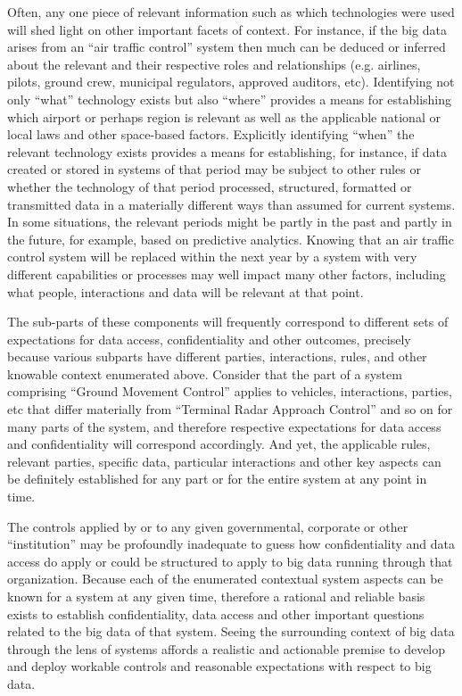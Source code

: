 Often, any one piece of relevant information such as which technologies were used will shed light on other important facets of context.
For instance, if the big data arises from an “air traffic control” system then much can be deduced or inferred about the relevant and their respective roles and relationships (e.g. airlines, pilots, ground crew, municipal regulators, approved auditors, etc).
Identifying not only “what” technology exists but also “where” provides a means for establishing which airport or perhaps region is relevant as well as the applicable national or local laws and other space-based factors. 
Explicitly identifying “when” the relevant technology exists provides a means for establishing, for instance, if data created or stored in systems of that period may be subject to other rules or whether the technology of that period processed, structured, formatted or transmitted data in a materially different ways than assumed for current systems.
In some situations, the relevant periods might be partly in the past and partly in the future, for example, based on predictive analytics.
Knowing that an air traffic control system will be replaced within the next year by a system with very different capabilities or processes may well impact many other factors, including what people, interactions and data will be relevant at that point.

The sub-parts of these components will frequently correspond to different sets of expectations for data access, confidentiality and other outcomes, precisely because various subparts have different parties, interactions, rules, and other knowable context enumerated above.
Consider that the part of a system comprising “Ground Movement Control” applies to vehicles, interactions, parties, etc that differ materially from “Terminal Radar Approach Control” and so on for many parts of the system, and therefore respective expectations for data access and confidentiality will correspond accordingly.
And yet, the applicable rules, relevant parties, specific data, particular interactions and other key aspects can be definitely established for any part or for the entire system at any point in time.

The controls applied by or to any given governmental, corporate or other “institution” may be profoundly inadequate to guess how confidentiality and data access do apply or could be structured to apply to big data running through that organization.
Because each of the enumerated contextual system aspects can be known for a system at any given time, therefore a rational and reliable basis exists to establish confidentiality, data access and other important questions related to the big data of that system.
Seeing the surrounding context of big data through the lens of systems affords a realistic and actionable premise to develop and deploy workable controls and reasonable expectations with respect to big data.

